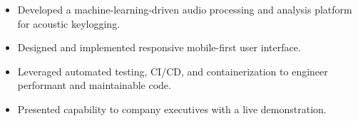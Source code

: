 \documentclass[10pt,a4paper,ragged2e,withhyper]{altacv}
\begin{document}


\divider

\begin{itemize}
\item Developed a machine-learning-driven audio processing and analysis platform for acoustic keylogging.
\item Designed and implemented responsive mobile-first user interface.
\item Leveraged automated testing, CI/CD, and containerization to engineer performant and maintainable code.
\item Presented capability to company executives with a live demonstration.
\end{itemize}




\end{document}
